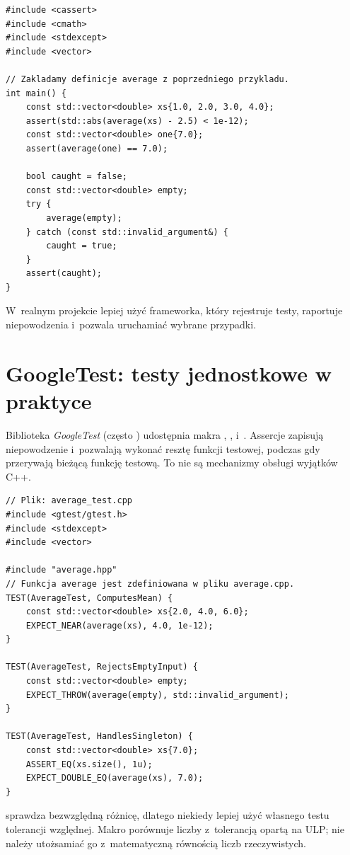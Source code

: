 \begin{lstlisting}[caption={Test funkcji average bez frameworka; dołącz pod jej definicją (C++20).}]
#include <cassert>
#include <cmath>
#include <stdexcept>
#include <vector>

// Zakladamy definicje average z poprzedniego przykladu.
int main() {
    const std::vector<double> xs{1.0, 2.0, 3.0, 4.0};
    assert(std::abs(average(xs) - 2.5) < 1e-12);
    const std::vector<double> one{7.0};
    assert(average(one) == 7.0);

    bool caught = false;
    const std::vector<double> empty;
    try {
        average(empty);
    } catch (const std::invalid_argument&) {
        caught = true;
    }
    assert(caught);
}
\end{lstlisting}

W~realnym projekcie lepiej użyć frameworka, który rejestruje testy,
raportuje niepowodzenia i~pozwala uruchamiać wybrane przypadki.

\section{GoogleTest: testy jednostkowe w praktyce}
\label{sec:cpp18-gtest}

Biblioteka \emph{GoogleTest} (często ) udostępnia makra
, ,  i~.
Assercje  zapisują niepowodzenie i~pozwalają wykonać
resztę funkcji testowej, podczas gdy  przerywają
bieżącą funkcję testową. To nie są mechanizmy obsługi wyjątków C++.

\begin{lstlisting}[caption={GoogleTest: wyniki, wyjatki i przyblizona rownosc.}]
// Plik: average_test.cpp
#include <gtest/gtest.h>
#include <stdexcept>
#include <vector>

#include "average.hpp"
// Funkcja average jest zdefiniowana w pliku average.cpp.
TEST(AverageTest, ComputesMean) {
    const std::vector<double> xs{2.0, 4.0, 6.0};
    EXPECT_NEAR(average(xs), 4.0, 1e-12);
}

TEST(AverageTest, RejectsEmptyInput) {
    const std::vector<double> empty;
    EXPECT_THROW(average(empty), std::invalid_argument);
}

TEST(AverageTest, HandlesSingleton) {
    const std::vector<double> xs{7.0};
    ASSERT_EQ(xs.size(), 1u);
    EXPECT_DOUBLE_EQ(average(xs), 7.0);
}
\end{lstlisting}

 sprawdza bezwzględną różnicę, dlatego
niekiedy lepiej użyć własnego testu tolerancji względnej. Makro
 porównuje liczby z~tolerancją opartą na ULP;
nie należy utożsamiać go z~matematyczną równością liczb rzeczywistych.

